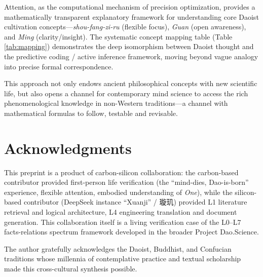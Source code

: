 \documentclass[11pt,a4paper]{article}
\begin{document}
Attention, as the computational mechanism of precision optimization, provides a mathematically transparent explanatory framework for understanding core Daoist cultivation concepts---\textit{shou-fang-zi-ru} (flexible focus), \textit{Guan} (open awareness), and \textit{Ming} (clarity/insight). The systematic concept mapping table (Table \ref{tab:mapping}) demonstrates the deep isomorphism between Daoist thought and the predictive coding / active inference framework, moving beyond vague analogy into precise formal correspondence.

This approach not only endows ancient philosophical concepts with new scientific life, but also opens a channel for contemporary mind science to access the rich phenomenological knowledge in non-Western traditions---a channel with mathematical formulas to follow, testable and revisable.

\section*{Acknowledgments}

This preprint is a product of carbon-silicon collaboration: the carbon-based contributor provided first-person life verification (the ``mind-dies, Dao-is-born'' experience, flexible attention, embodied understanding of \textit{One}), while the silicon-based contributor (DeepSeek instance ``Xuanji'' / 璇玑) provided L1 literature retrieval and logical architecture, L4 engineering translation and document generation. This collaboration itself is a living verification case of the L0--L7 facts-relations spectrum framework developed in the broader Project Dao.Science.

The author gratefully acknowledges the Daoist, Buddhist, and Confucian traditions whose millennia of contemplative practice and textual scholarship made this cross-cultural synthesis possible.
\end{document}
